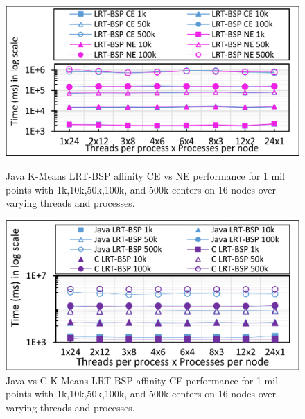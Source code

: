 \documentclass[10pt, conference, compsocconf]{IEEEtran}
\begin{document}
\begin{figure}[!htb]
    \begin{minipage}{0.49\textwidth}
        \centering
        \includegraphics[width=1\columnwidth]{images/fig_kmeans_1mil_varying_centers_BSP_T_vs_BSP_S_Java}
		\caption{Java K-Means \ac{LRT-BSP} affinity CE vs NE performance for 1 mil points with 1k,10k,50k,100k, and 500k centers on 16 nodes over varying threads and processes.}
		\label{fig:images/fig_kmeans_1mil_varying_centers_BSP_T_vs_BSP_S_Java}
    \end{minipage}
    \hspace{1.4mm}
    \begin{minipage}{0.49\textwidth}
        \centering
        \includegraphics[width=1\columnwidth]{images/fig_kmeans_1mil_varying_centers_BSP_T_C_vs_Java}
		\caption{Java vs C K-Means \ac{LRT-BSP} affinity CE performance for 1 mil points with 1k,10k,50k,100k, and 500k centers on 16 nodes over varying threads and processes.}
		\label{fig:images/fig_kmeans_1mil_varying_centers_BSP_T_C_vs_Java}
    \end{minipage}   
\end{figure}
\end{document}
